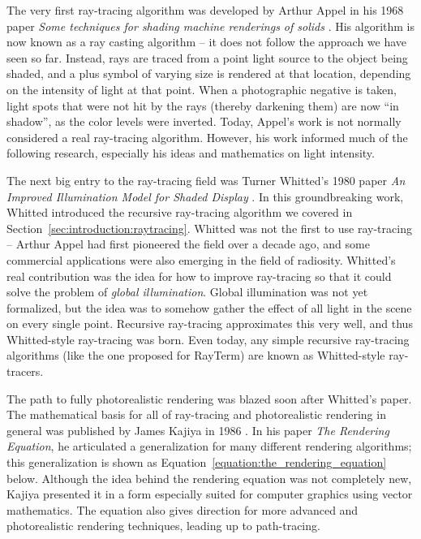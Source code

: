 \documentclass[11pt]{article}
\def\widow#1{\vskip #1\vbadness10000\penalty-200\vskip-#1}
\def\littlesection#1{
  \widow{2cm}
  \vskip 0.5cm
  \noindent{\bf #1}
  \vskip 0.0001cm
}
\newcommand{\name}{{\sc RayTerm}}
\begin{document}
The very first ray-tracing algorithm was developed by Arthur Appel in his 1968 paper {\it Some techniques for shading machine renderings of solids} \cite{appel1968some}.
His algorithm is now known as a ray casting algorithm -- it does not follow the approach we have seen so far.
Instead, rays are traced from a point light source to the object being shaded, and a plus symbol of varying size is rendered at that location, depending on the intensity of light at that point.
When a photographic negative is taken, light spots that were not hit by the rays (thereby darkening them) are now ``in shadow'', as the color levels were inverted.
Today, Appel's work is not normally considered a real ray-tracing algorithm.
However, his work informed much of the following research, especially his ideas and mathematics on light intensity.

\littlesection{The Breakthrough}

The next big entry to the ray-tracing field was Turner Whitted's 1980 paper {\it An Improved Illumination Model for Shaded Display} \cite{whitted1980improved}.
In this groundbreaking work, Whitted introduced the recursive ray-tracing algorithm we covered in Section~\ref{sec:introduction:raytracing}.
Whitted was not the first to use ray-tracing -- Arthur Appel had first pioneered the field over a decade ago, and some commercial applications were also emerging in the field of radiosity.
Whitted's real contribution was the idea for how to improve ray-tracing so that it could solve the problem of {\it global illumination}.
Global illumination was not yet formalized, but the idea was to somehow gather the effect of all light in the scene on every single point.
Recursive ray-tracing approximates this very well, and thus Whitted-style ray-tracing was born.
Even today, any simple recursive ray-tracing algorithms (like the one proposed for \name) are known as Whitted-style ray-tracers.

\littlesection{Formalization}

The path to fully photorealistic rendering was blazed soon after Whitted's paper.
The mathematical basis for all of ray-tracing and photorealistic rendering in general was published by James Kajiya in 1986 \cite{kajiya1986rendering}.
In his paper {\it The Rendering Equation}, he articulated a generalization for many different rendering algorithms; this generalization is shown as Equation~\ref{equation:the_rendering_equation} below.
Although the idea behind the rendering equation was not completely new, Kajiya presented it in a form especially suited for computer graphics using vector mathematics.
The equation also gives direction for more advanced and photorealistic rendering techniques, leading up to path-tracing.
\end{document}
